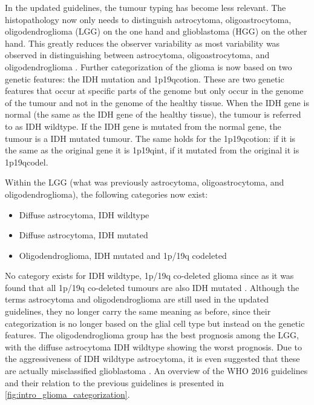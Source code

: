In the updated guidelines, the tumour typing has become less relevant.
The histopathology now only needs to distinguish astrocytoma, oligoastrocytoma, oligodendroglioma (\gls{LGG}) on the one hand and glioblastoma (\gls{HGG}) on the other hand.
This greatly reduces the observer variability as most variability was observed in distinguishing between astrocytoma, oligoastrocytoma, and oligodendroglioma \autocite{mittler1996gradingreliability}.
Further categorization of the glioma is now based on two genetic features:  the \gls{IDH} mutation and \acl{1p19qcotion}.
These are two genetic features that occur at specific parts of the genome but only occur in the genome of the tumour and not in the genome of the healthy tissue.
When the \gls{IDH} gene is normal (the same as the \gls{IDH} gene of the healthy tissue), the tumour is referred to as \gls{IDH} wildtype.
If the \gls{IDH} gene is mutated from the normal gene, the tumour is a \gls{IDH} mutated tumour.
The same holds for the \acl{1p19qcotion}: if it is the same as the original gene it is \acl{1p19qint}, if it mutated from the original it is \acl{1p19qcodel}.

Within the \gls{LGG} (what was previously astrocytoma, oligoastrocytoma, and oligodendroglioma), the following categories now exist:
\begin{itemize}
    \item Diffuse astrocytoma, \gls{IDH} wildtype
    \item Diffuse astrocytoma, \gls{IDH} mutated
    \item Oligodendroglioma, \gls{IDH} mutated and 1p/19q codeleted
\end{itemize}
No category exists for \gls{IDH} wildtype, 1p/19q co-deleted glioma since as it was found that all 1p/19q co-deleted tumours are also IDH mutated \autocite{labussi20101p19qcodeletedIDH}.
Although the terms astrocytoma and oligodendroglioma are still used in the updated guidelines, they no longer carry the same meaning as before, since their categorization is no longer based on the glial cell type but instead on the genetic features.
The oligodendroglioma group has the best prognosis among the \gls{LGG}, with the diffuse astrocytoma IDH wildtype showing the worst prognosis.
Due to the aggressiveness of IDH wildtype astrocytoma, it is even suggested that these are actually misclassified glioblastoma \autocite{hartmann2010IDH1gbm, brat2018IMPACT}.
An overview of the \gls{WHO} 2016 guidelines and their relation to the previous guidelines is presented in \cref{fig:intro_glioma_categorization}.


